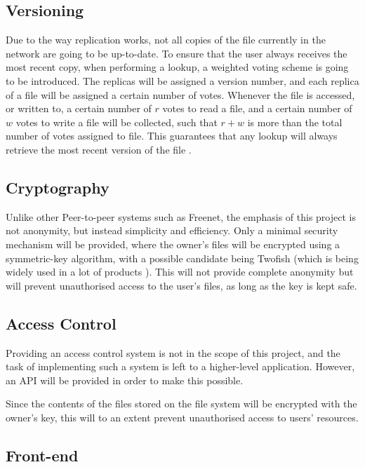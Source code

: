 \documentclass[8pt,a4paper]{article}
\begin{document}
\subsection{Versioning}
Due to the way replication works, not all copies of the file currently in the network are going to be up-to-date. To ensure that the user always receives the most recent copy, when performing a lookup, a weighted voting scheme is going to be introduced. The replicas will be assigned a version number, and each replica of a file will be assigned a certain number of votes. Whenever the file is accessed, or written to, a certain number of $r$ votes to read a file, and a certain number of $w$ votes to write a file will be collected, such that $r + w$ is more than the total number of votes assigned to file. This guarantees that any lookup will always retrieve the most recent version of the file \cite{versioning}.

\subsection{Cryptography}

Unlike other Peer-to-peer systems such as Freenet, the emphasis of this project is not anonymity, but instead simplicity and efficiency. Only a minimal security mechanism will be provided, where the owner's files will be encrypted using a symmetric-key algorithm, with a possible candidate being Twofish (which is being widely used in a lot of products \cite{twofishprod}).
This will not provide complete anonymity but will prevent unauthorised access to the user's files, as long as the key is kept safe.

\subsection{Access Control}

Providing an access control system is not in the scope of this project, and the task of implementing such a system is left to a higher-level application. However, an API will be provided in order to make this possible. 

Since the contents of the files stored on the file system will be encrypted with the owner's key, this will to an extent prevent unauthorised access to users' resources.

\subsection{Front-end}
\end{document}
